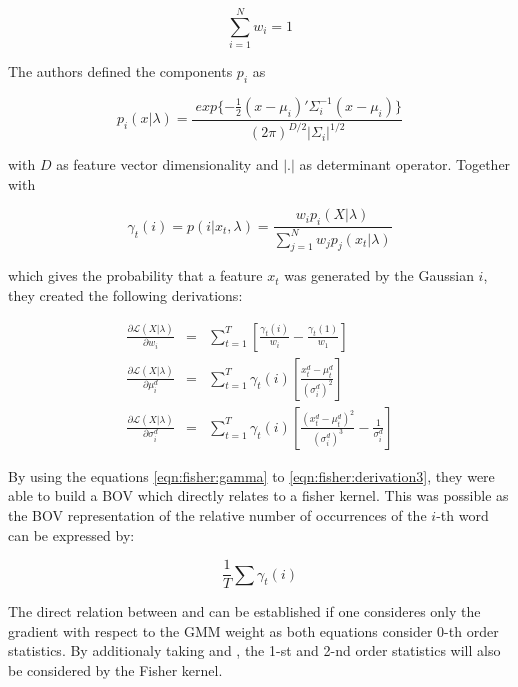 \begin{equation}
\sum_{i=1}^{N} w_i = 1
\label{eqn:fisher_weights}
\end{equation}

The authors defined the components $p_i$ as

\begin{equation}
p_i(x|\lambda) = \frac{
	\ 	exp \{-\frac{1}{2} (x-\mu_i)' \Sigma_{i}^{-1} (x-\mu_i)\}
}{
	(2 \pi)^{D/2} | \Sigma_i |^{1/2}
}
\end{equation}

with $D$ as feature vector dimensionality and $|.|$ as determinant operator. Together with

\begin{equation}
\gamma_t(i) = p(i|x_t,\lambda) = \frac{w_i p_i(X|\lambda) }{\sum_{j=1}^{N} w_j p_j(x_t|\lambda)}
\label{eqn:fisher:gamma}
\end{equation}

which gives the probability that a feature $x_t$ was generated by the Gaussian $i$, they created the following derivations:

\begin{eqnarray}
\frac{\partial \mathcal{L} (X|\lambda)}{\partial w_i} &=& \sum_{t=1}^{T} \left[ \frac{\gamma_t(i)}{w_i} - \frac{\gamma_t(1)}{w_1} \right]
\label{eqn:fisher:derivation1}\\
\frac{\partial \mathcal{L} (X|\lambda)}{\partial \mu_i^d} &=& \sum_{t=1}^{T} \gamma_t(i) \left[ \frac{x_t^d - \mu_t^d}{(\sigma_i^d)^2} \right]
\label{eqn:fisher:derivation2}\\
\frac{\partial \mathcal{L} (X|\lambda)}{\partial \sigma_i^d} &=& \sum_{t=1}^{T} \gamma_t(i) \left[ \frac{(x_t^d - \mu_t^d)^2}{(\sigma_i^d)^3} - \frac{1}{\sigma_i^d} \right]
\label{eqn:fisher:derivation3}
\end{eqnarray}

By using the equations \ref{eqn:fisher:gamma} to \ref{eqn:fisher:derivation3}, they were able to build a \ac{BOV} which directly relates to a fisher kernel. This was possible as the \ac{BOV} representation of the relative number of occurrences of the $i$-th word can be expressed by:

\begin{equation}
\frac{1}{T} \sum \gamma_t(i)
\label{eqn:fisher:bov}
\end{equation}

The direct relation between  and  can be established if one consideres only the gradient with respect to the \ac{GMM} weight as both equations consider 0-th order statistics. By additionaly taking  and , the 1-st and 2-nd order statistics will also be considered by the Fisher kernel.

